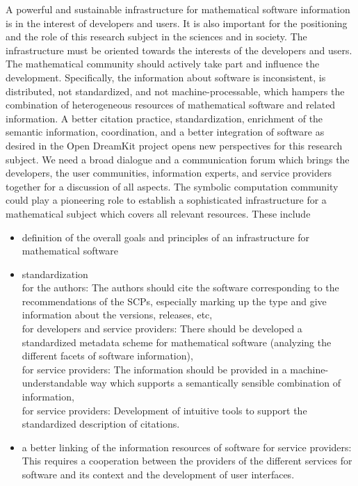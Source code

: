 \documentclass[12pt]{article}
\begin{document}
A powerful and sustainable infrastructure for mathematical software information
is in the interest of developers and users.  It is also important for the
positioning and the role of this research subject in the sciences and in
society.  The infrastructure must be oriented towards the interests of the
developers and users. The mathematical community should actively take part and
influence the development.  Specifically, the information about software is
inconsistent, is distributed, not standardized, and not machine-processable,
which hampers the combination of heterogeneous resources of mathematical
software and related information. A better citation practice, standardization,
enrichment of the semantic information, coordination, and a better integration
of software as desired in the Open DreamKit project \cite{OpenDreamKit} opens
new perspectives for this research subject.  We need a broad dialogue and a
communication forum which brings the developers, the user communities,
information experts, and service providers together for a discussion of all
aspects. The symbolic computation community could play a pioneering role to
establish a sophisticated infrastructure for a mathematical subject which
covers all relevant resources. These include
\begin{itemize}
\item{definition of the overall goals and principles of an infrastructure for
  mathematical software}
\item{standardization}\\ for the authors: The authors should cite the software
  corresponding to the recommendations of the SCPs, especially marking up the
  type and give information about the versions, releases, etc,\\ for developers
  and service providers: There should be developed a standardized metadata
  scheme for mathematical software (analyzing the different facets of software
  information),\\ for service providers: The information should be provided in
  a machine-understandable way which supports a semantically sensible
  combination of information,\\ for service providers: Development of intuitive
  tools to support the standardized description of citations.
\item{a better linking of the information resources of software} for service
  providers: This requires a cooperation between the providers of the different
  services for software and its context and the development of user interfaces.
\end{itemize}
\end{document}
